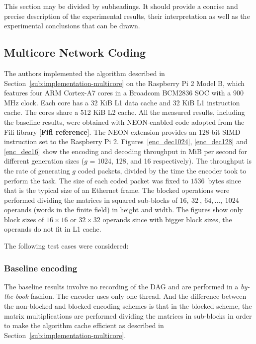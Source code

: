 \label{sec:measurements}

This section may be divided by subheadings. It should provide a concise and
precise description of the experimental results, their interpretation as well as
the experimental conclusions that can be drawn.

\subsection{Multicore Network Coding}
\label{subs:multicore-network-coding}

The authors implemented the algorithm described in
Section~\ref{sub:implementation-multicore} on the Raspberry Pi 2 Model B,
which features four ARM Cortex-A7 cores in a Broadcom BCM2836 \ac{SOC}
with a 900 MHz clock. Each core has a 32 KiB L1 data cache and 32 KiB
L1 instruction cache. The cores share a 512 KiB L2 cache. All the
measured results, including the baseline results, were obtained with
NEON-enabled code adopted from the Fifi library [\textbf{Fifi reference}].
The NEON extension provides an 128-bit \ac{SIMD} instruction set to the
Raspberry Pi 2. Figures~\ref{enc_dec1024}, \ref{enc_dec128} and
\ref{enc_dec16} show the encoding and decoding throughput in MiB per
second for different generation sizes ($g$ = 1024, 128, and 16
respectively). The throughput is the rate of generating $g$ coded packets,
divided by the time the encoder took to perform the task. The size of
each coded packet was fixed to $1536$~bytes since that is the typical
size of an Ethernet frame. The blocked operations were performed dividing
the matrices in squared sub-blocks of $16,\ 32\ ,\ 64,\ldots,\ 1024$ operands
(words in the finite field) in height and width. The figures show only
block sizes of $16 \times 16$ or $32 \times 32$ operands since with bigger
block sizes, the operands do not fit in L1 cache.

The following test cases were considered:

\subsubsection{Baseline encoding}
The baseline results involve no recording of the
\ac{DAG} and are performed in a \emph{by-the-book} fashion. The encoder uses
only one thread. And the difference between the non-blocked and blocked
encoding schemes is that in the blocked scheme, the matrix multiplications are
performed dividing the matrices in sub-blocks in order to make the algorithm
cache efficient as described in Section~\ref{sub:implementation-multicore}.

